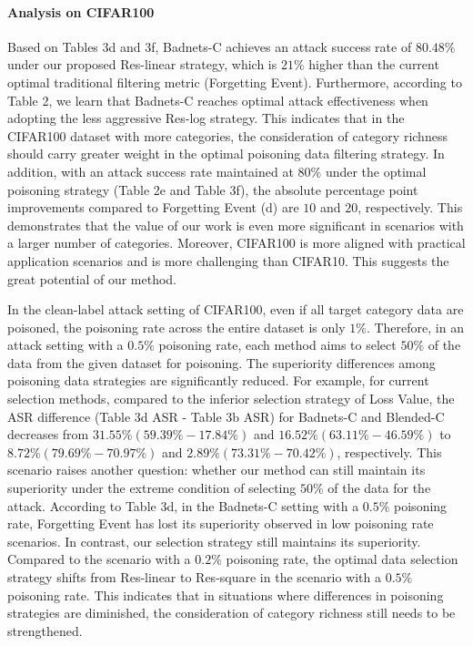 \documentclass{article}
\begin{document}
\paragraph{Analysis on CIFAR100}
Based on Tables 3d and 3f, Badnets-C achieves an attack success rate of \(80.48\%\) under our proposed Res-linear strategy, which is \(21\%\) higher than the current optimal traditional filtering metric (Forgetting Event). Furthermore, according to Table 2, we learn that Badnets-C reaches optimal attack effectiveness when adopting the less aggressive Res-log strategy. This indicates that in the CIFAR100 dataset with more categories, the consideration of category richness should carry greater weight in the optimal poisoning data filtering strategy. In addition, with an attack success rate maintained at \(80\%\) under the optimal poisoning strategy (Table 2e and Table 3f), the absolute percentage point improvements compared to Forgetting Event (d) are \(10\) and \(20\), respectively. This demonstrates that the value of our work is even more significant in scenarios with a larger number of categories. Moreover, CIFAR100 is more aligned with practical application scenarios and is more challenging than CIFAR10. This suggests the great potential of our method.

In the clean-label attack setting of CIFAR100, even if all target category data are poisoned, the poisoning rate across the entire dataset is only \(1\%\). Therefore, in an attack setting with a \(0.5\%\) poisoning rate, each method aims to select \(50\%\) of the data from the given dataset for poisoning. The superiority differences among poisoning data strategies are significantly reduced. For example, for current selection methods, compared to the inferior selection strategy of Loss Value, the ASR difference (Table 3d ASR - Table 3b ASR) for Badnets-C and Blended-C decreases from \(31.55\% (59.39\% - 17.84\%)\) and \(16.52\% (63.11\% - 46.59\%)\) to \(8.72\% (79.69\% - 70.97\%)\) and \(2.89\% (73.31\% - 70.42\%)\), respectively. This scenario raises another question: whether our method can still maintain its superiority under the extreme condition of selecting \(50\%\) of the data for the attack. According to Table 3d, in the Badnets-C setting with a \(0.5\%\) poisoning rate, Forgetting Event has lost its superiority observed in low poisoning rate scenarios. In contrast, our selection strategy still maintains its superiority. Compared to the scenario with a \(0.2\%\) poisoning rate, the optimal data selection strategy shifts from Res-linear to Res-square in the scenario with a \(0.5\%\) poisoning rate. This indicates that in situations where differences in poisoning strategies are diminished, the consideration of category richness still needs to be strengthened. 
\end{document}
